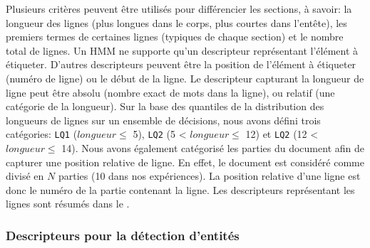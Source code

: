 Plusieurs critères peuvent être utilisés pour différencier les sections, à savoir: la longueur des lignes (plus longues dans le corps, plus courtes dans l'entête), les premiers termes de certaines lignes (typiques de chaque section) et le nombre total de lignes. Un HMM ne supporte qu'un descripteur représentant l'élément à étiqueter. D'autres descripteurs peuvent être la position de l'élément à étiqueter (numéro de ligne) ou le début de la ligne. Le descripteur capturant la longueur de ligne peut être absolu (nombre exact de mots dans la ligne), ou relatif (une catégorie de la longueur). Sur la base des quantiles de la distribution des longueurs de lignes sur un ensemble de décisions, nous avons défini trois catégories:
\verb|LQ1| ($longueur \leq$ 5), \verb|LQ2| (5 < $longueur \leq$ 12) et \verb|LQ2| (12 < $longueur \leq$ 14). Nous avons également catégorisé les parties du document afin de capturer une position relative de ligne.
En effet, le document est considéré comme divisé en $N$ parties (10 dans nos expériences). La position relative d'une ligne est donc le numéro de la partie contenant la ligne. Les descripteurs représentant les lignes sont résumés dans le .

\subsubsection{Descripteurs pour la détection d'entités}

